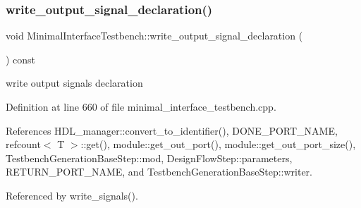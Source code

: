 \subsubsection{\texorpdfstring{write\+\_\+output\+\_\+signal\+\_\+declaration()}{write\_output\_signal\_declaration()}}
{\footnotesize\ttfamily void Minimal\+Interface\+Testbench\+::write\+\_\+output\+\_\+signal\+\_\+declaration (\begin{DoxyParamCaption}{ }\end{DoxyParamCaption}) const\hspace{0.3cm}{\ttfamily [protected]}}

write output signals declaration 

Definition at line 660 of file minimal\+\_\+interface\+\_\+testbench.\+cpp.



References H\+D\+L\+\_\+manager\+::convert\+\_\+to\+\_\+identifier(), D\+O\+N\+E\+\_\+\+P\+O\+R\+T\+\_\+\+N\+A\+ME, refcount$<$ T $>$\+::get(), module\+::get\+\_\+out\+\_\+port(), module\+::get\+\_\+out\+\_\+port\+\_\+size(), Testbench\+Generation\+Base\+Step\+::mod, Design\+Flow\+Step\+::parameters, R\+E\+T\+U\+R\+N\+\_\+\+P\+O\+R\+T\+\_\+\+N\+A\+ME, and Testbench\+Generation\+Base\+Step\+::writer.



Referenced by write\+\_\+signals().

